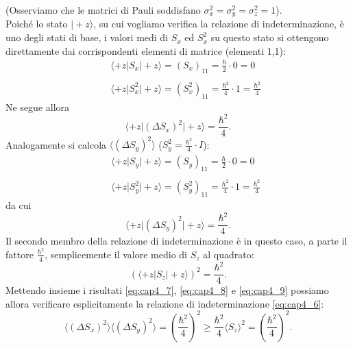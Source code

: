 (Osserviamo che le matrici di Pauli soddisfano $\sigma _x ^2 = \sigma _y ^2 = \sigma _z ^2 =1$).\\
Poiché lo stato $\vert +z \rangle$, su cui vogliamo verifica la relazione di indeterminazione, è uno degli stati di base, i valori medi di $S_x$ ed $S_x ^2$ su questo stato si ottengono direttamente dai corrispondenti elementi di matrice (elementi 1,1):
\begin{eqnarray}
& &\displaystyle{\langle +z \vert S_x \vert +z \rangle = (S_x)_{11} = \frac{\hbar}{2}\cdot 0 =0}  \nonumber \\
\\
& &\displaystyle{\langle +z \vert S_x ^2\vert +z \rangle = (S_x ^2)_{11} = \frac{\hbar ^2}{4}\cdot 1 =\frac{\hbar ^2}{4}} \nonumber
\end{eqnarray}
Ne segue allora
\begin{equation}
\label{eq:cap4_7}
\langle +z \vert (\Delta S_x)^2\vert +z \rangle = \frac{\hbar ^2}{4}.
\end{equation}
Analogamente si calcola $\langle (\Delta S_y)^2 \rangle $ ($S_y ^2= \frac{\hbar ^2}{4}\cdot I$):
\begin{eqnarray}
& &\displaystyle{\langle +z \vert S_y \vert +z \rangle = (S_y)_{11} = \frac{\hbar}{2}\cdot 0 =0}  \nonumber \\
\\
& &\displaystyle{\langle +z \vert S_y ^2\vert +z \rangle = (S_y ^2)_{11} = \frac{\hbar ^2}{4}\cdot 1 =\frac{\hbar ^2}{4}} \nonumber
\end{eqnarray}
da cui
\begin{equation}
\label{eq:cap4_8}
\langle +z \vert (\Delta S_y)^2\vert +z \rangle = \frac{\hbar ^2}{4}.
\end{equation}
Il secondo membro della relazione di indeterminazione è in questo caso, a parte il fattore $\frac{\hbar ^2}{4}$, semplicemente il valore medio di $S_z$ al quadrato:
\begin{equation}
\label{eq:cap4_9}
\left( \langle +z \vert S_z \vert +z \rangle \right) ^2 = \frac{\hbar ^2}{4}.
\end{equation}
Mettendo insieme i risultati \eqref{eq:cap4_7}, \eqref{eq:cap4_8} e \eqref{eq:cap4_9} possiamo allora verificare esplicitamente la relazione di indeterminazione \eqref{eq:cap4_6}:
\begin{equation}
\langle  (\Delta S_x)^2 \rangle \langle(\Delta S_y)^2 \rangle = \left(\frac{\hbar ^2}{4} \right) ^2 \geq \frac{\hbar ^2}{4} \langle S_z  \rangle ^2 = \left(\frac{\hbar ^2}{4} \right) ^2.
\end{equation}
